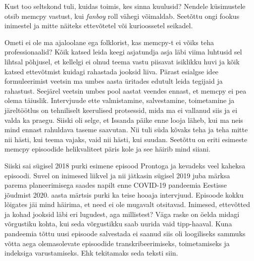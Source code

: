 Kust too seltskond tuli, kuidas toimis, kes sinna kuulusid? Nendele küsimustele 
otsib memcpy vastust, kui \emph{fanboy} roll vähegi võimaldab. Seetõttu ongi 
fookus inimestel ja mitte näiteks ettevõtetel 
või kurioossetel seikadel. 

Ometi ei ole ma ajaloolane ega folklorist, kas memcpy-t ei võiks teha 
professionaalid? Kõik katsed leida keegi asjatundja asja läbi viima luhtusid 
sel lihtsal põhjusel, et kellelgi ei olnud teema vastu piisavat isiklikku huvi 
ja kõik katsed ettevõtmist kuidagi rahastada jooksid liiva. Pärast esialgse 
idee formuleerimist veetsin ma umbes aasta üritades edutult leida tegijaid ja 
rahastust. Seejärel veetsin umbes pool aastat veendes ennast, et memcpy ei pea 
olema täiuslik. Intervjuude ette valmistamine, salvestamine, toimetamine ja 
järeltöötlus on tehniliselt keerulised protsessid, mida ma ei vallanud siis ja 
ei valda ka praegu. Siiski oli selge, et Issanda päike enne looja läheb, kui ma 
neis mind ennast rahuldava taseme saavutan. Nii tuli süda kõvaks teha ja teha 
mitte nii hästi, kui teema vajaks, vaid nii hästi, kui suudan. Seetõttu on 
eriti esimeste memcpy episoodide helikvaliteet päris kole ja see häirib mind 
siiani.

Siiski sai sügisel 2018 purki esimene episood Prontoga ja 
kevadeks veel kaheksa episoodi. Suvel on inimesed liikvel ja nii jätkasin 
sügisel 2019 juba märksa parema planeerimisega saades napilt enne COVID-19 
pandeemia Eestisse jõudmist 2020. aasta märtsis purki ka teise hooaja 
intervjuud. Episoode kokku lõigates jäi mind häirima, et need ei ole mugavalt 
otsitavad. Inimesed, ettevõtted ja kohad jooksid läbi eri lugudest, aga 
millistest? Väga raske on öelda midagi võrgustiku kohta, kui seda võrgustikku 
saab uurida vaid tipp-haaval. Kuna pandeemia tõttu uusi episoode salvestada ei 
saanud siis oli loogiliseks sammuks võtta aega olemasolevate episoodide 
transkribeerimiseks, toimetamiseks ja indeksiga varustamiseks. Ehk tekitamaks 
seda teksti siin. 

